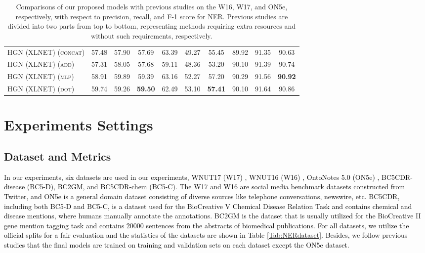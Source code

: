\documentclass[11pt]{article}
\begin{document}
\begin{table*}[t]
{\begin{tabular}{lccccccccc}
\textsc{HGN (XLNET) (concat)} & {57.48} & {57.90}   & {57.69} 
& {63.39} & {49.27} & {55.45} 
& {89.92}& {91.35}& {90.63}\\
\textsc{HGN (XLNET) (add)} & {57.31} & {58.05}   & {57.68} 
& {59.11} & {48.36} & {53.20} 
& {90.10}& {91.39}& {90.74}\\
\textsc{HGN (XLNET) (mlp)} 
& {58.91} & {59.89}   & {59.39}
& {63.16} &  {52.27} & {57.20} 
& {90.29}& {91.56}& \textbf{90.92}\\
\textsc{HGN (XLNET) (dot)} 
& {59.74} &  {59.26}   & \textbf{59.50}
& {62.49} & {53.10} & \textbf{57.41} 
& {90.10}& {91.64}& {90.86}\\
\bottomrule
 \end{tabular}}
   \caption{Comparisons of our proposed models with previous studies on the W16, W17, and ON5e, respectively, with respect to precision, recall, and F-1 score for NER. 
  Previous studies are divided into two parts from top to bottom, representing methods requiring extra resources and without such requirements, respectively.
   }\label{Tab:NER}
\vspace{-2mm}
\end{table*} 



\section{Experiments Settings}
\subsection{Dataset and Metrics}
\textcolor{black}{
In our experiments, six datasets are used in our experiments, WNUT17 (W17) \cite{w16}, WNUT16 (W16) \cite{w17}, OntoNotes 5.0 (ON5e) \cite{pradhan2013towards}, BC5CDR-disease (BC5-D), BC2GM, and BC5CDR-chem (BC5-C).
The W17 and W16 are social media benchmark datasets constructed from Twitter, and ON5e is a general domain dataset consisting of diverse sources like telephone conversations, newswire, etc.
\textcolor{black}{BC5CDR, including both BC5-D and BC5-C, is a dataset used for the BioCreative V Chemical Disease Relation Task and contains chemical and disease mentions, where humans manually annotate the annotations.} 
BC2GM is the dataset that is usually utilized for the BioCreative II gene mention tagging task and contains 20000 sentences from the abstracts of biomedical publications.
For all datasets, we utilize the official splits for a fair evaluation and the statistics of the datasets are shown in Table \ref{Tab:NERdataset}.
Besides, we follow previous studies that the final models are trained on training and validation sets on each dataset except the ON5e dataset.
}
\end{document}
